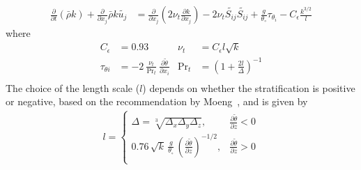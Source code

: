 \begin{align}
  \frac{\partial}{\partial t}\left(\bar{\rho} k \right) + \frac{\partial}{\partial x_j} \bar{\rho} k \widetilde{u_j} &= \frac{\partial}{\partial x_j} \left (2 \nu_t \frac{\partial k}{\partial x_j} \right) - 2 \nu_t \widetilde{S_{ij}} \widetilde{S_{ij}} + \frac{g}{\theta_\circ} \tau_{\theta_i} - C_{\epsilon} \frac{k^{3/2}}{l} \label{eqn:ksgs-les}
\end{align}
where
\begin{align}
  C_\epsilon &= 0.93 & \nu_t &= C_\epsilon l \sqrt{k} \\
  \tau_{\theta i} &= - 2\ \frac{\nu_t}{\mathrm{Pr}_t}\ \frac{\partial \widetilde{\theta}}{\partial x_i} & \mathrm{Pr}_t &= \left( 1 + \frac{2l}{\Delta} \right)^{-1} \\
\end{align}
The choice of the length scale ($l$) depends on whether the stratification is positive
or negative, based on the recommendation by Moeng~\cite{Moeng1984}, and is given
by
\begin{align}
  l =
  \begin{cases}
    \Delta = \sqrt[3]{\Delta_x \Delta_y \Delta_z}, & \frac{\partial \widetilde{\theta}}{\partial z} < 0 \\
    0.76\, \sqrt{k}\, \frac{g}{\theta_\circ}\, \left( \frac{\partial \widetilde{\theta}}{\partial z}\right)^{-1/2}, &  \frac{\partial \widetilde{\theta}}{\partial z} > 0 \\
  \end{cases}
\end{align}

